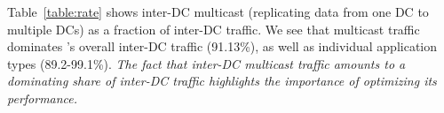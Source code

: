 Table~\ref{table:rate} shows inter-DC multicast
(replicating data from one DC to multiple DCs) as
a fraction of inter-DC traffic.
We see that multicast traffic dominates \company's
overall inter-DC traffic (91.13\%), as well as
individual application types (89.2-99.1\%).
{\em The fact that inter-DC multicast traffic
amounts to a dominating share of inter-DC traffic
highlights the importance of optimizing its
performance.}


